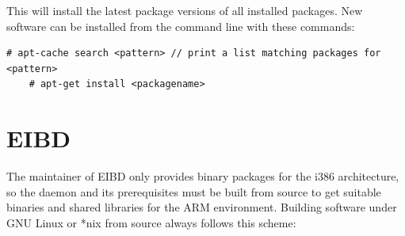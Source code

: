 This will install the latest package versions of all installed packages. New software can be installed from the command line with these commands:

\begin{lstlisting}[style=BashInputStyle]
    # apt-cache search <pattern> // print a list matching packages for <pattern> 
    # apt-get install <packagename>
\end{lstlisting}

\section{EIBD}

The maintainer of EIBD only provides binary packages for the i386 architecture, so the daemon and its prerequisites must be built from source to get
suitable binaries and shared libraries for the ARM environment. Building software under GNU Linux or *nix from source always follows this scheme:

